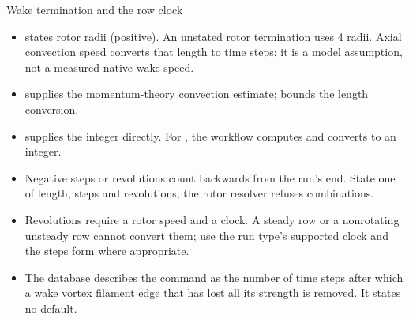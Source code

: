 \begin{frame}{Wake termination and the row clock}
\begin{itemize}\small
  \item {} states rotor radii (positive).
        An unstated rotor termination uses 4 radii. Axial convection speed
        converts that length to time steps; it is a model assumption, not
        a measured native wake speed.
  \item {} supplies the momentum-theory
        convection estimate; 
        bounds the length conversion.
  \item {} supplies the integer directly.
        For , the workflow computes
         and converts to an integer.
  \item Negative steps or revolutions count backwards from the run's end.
        State one of length, steps and revolutions;
        the rotor resolver refuses combinations.
  \item Revolutions require a rotor speed and a clock. A steady row or
        a nonrotating unsteady row cannot convert them; use the run type's
        supported clock and the steps form where appropriate.
  \item The database describes the command as the number of time steps
        after which a wake vortex filament edge that has lost all its
        strength is removed. It states no default.
\end{itemize}
\end{frame}
